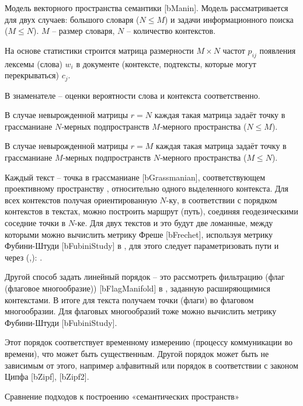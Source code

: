 Модель векторного пространства семантики [bManin]. Модель рассматривается для двух случаев: большого словаря ($N\leq{M}$) и задачи информационного поиска ($M\leq{N}$). $M$ -- размер словаря, $N$ -- количество контекстов.

На основе статистики строится матрица размерности $M\times{N}$ частот $p_{ij}$ появления лексемы (слова) $w_{i}$ в документе (контексте, подтексты, которые могут перекрываться) $c_{j}$.

В знаменателе -- оценки вероятности слова и контекста соответственно.

В случае невырожденной матрицы $r=N$ каждая такая матрица задаёт точку в грассманиане $N$‑мерных подпространств $M$‑мерного пространства ($N\leq{M}$).

В случае невырожденной матрицы $r=M$ каждая такая матрица задаёт точку в грассманиане $M$‑мерных подпространств $N$‑мерного пространства ($M\leq{N}$).

Каждый текст -- точка в грассманиане [bGrassmanian], соответствующем проективному пространству , относительно одного выделенного контекста. Для всех контекстов получая ориентированную $N$-ку, в соответствии с порядком контекстов в текстах, можно построить маршрут (путь), соединяя геодезическими соседние точки в $N$-ке. Для двух текстов  и  это будут две ломанные, между которыми можно вычислить метрику Фреше [bFrechet], используя метрику Фубини-Штуди [bFubiniStudy] в , для этого следует параметризовать пути  и  через  (,): 
.

Другой способ задать линейный порядок -- это рассмотреть фильтрацию (флаг (флаговое многообразие)) [bFlagManifold] в , заданную расширяющимися контекстами. В итоге для текста получаем точки (флаги) во флаговом многообразии. Для флаговых многообразий тоже можно вычислить метрику Фубини-Штуди [bFubiniStudy].

Этот порядок соответствует временному измерению (процессу коммуникации во времени), что может быть существенным. Другой порядок может быть не зависимым от этого, например алфавитный или порядок в соответствии с законом Ципфа [bZipf], [bZipf2]. 

Сравнение подходов к построению «семантических пространств»

